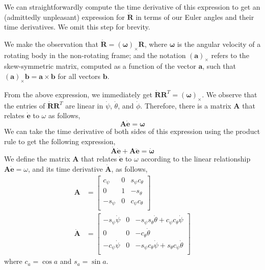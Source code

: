 We can straightforwardly compute the time derivative of this expression to get an (admittedly unpleasant) expression for $\dot{\mathbf{R}}$ in terms of our Euler angles and their time derivatives.
We omit this step for brevity.

We make the observation that $\dot{\mathbf{R}} = (\mathbf{\omega})_{\times} \mathbf{R}$, where $\mathbf{\omega}$ is the angular velocity of a rotating body in the non-rotating frame; and the notation $\left( \mathbf{a} \right)_{\times}$ refers to the skew-symmetric matrix, computed as a function of the vector $\mathbf{a}$, such that $\left(\mathbf{a}\right)_{\times}\mathbf{b} = \mathbf{a}\times\mathbf{b}$ for all vectors $\mathbf{b}$. 

From the above expression, we immediately get $\dot{\mathbf{R}} \mathbf{R}^{T} = (\mathbf{\omega})_{\times}$.
We observe that the entries of $\dot{\mathbf{R}} \mathbf{R}^{T}$ are linear in  $\dot\psi$, $\dot\theta$, and $\dot\phi$.
Therefore, there is a matrix $\mathbf{A}$ that relates $\dot{\mathbf{e}}$ to $\omega$ as follows,
%
\begin{equation}
\mathbf{A} \dot{\mathbf{e}} = \mathbf{\omega}
\label{eqn:ch2:w}
\end{equation}
%
We can take the time derivative of both sides of this expression using the product rule to get the following expression,
%
\begin{equation}
\dot{\mathbf{A}} \dot{\mathbf{e}} + \mathbf{A} \ddot{\mathbf{e}} = \dot{\mathbf{\omega}}
\label{eqn:ch2:w_dot}
\end{equation}
%
We define the matrix $\mathbf{A}$ that relates $\dot{\mathbf{e}}$ to $\omega$ according to the linear relationship $\mathbf{A} \dot{\mathbf{e}} = \omega$, and its time derivative $\dot{\mathbf{A}}$, as follows,
%
\begin{equation}
\begin{aligned}
%
\mathbf{A} & =
\begin{bmatrix}
c_\psi  & 0 & s_\psi c_\theta \\
0       & 1 & -s_\theta       \\
-s_\psi & 0 & c_\psi c_\theta \\
\end{bmatrix} \\
%
\dot{\mathbf{A}} & =
\begin{bmatrix}
-s_\psi \dot{\psi} & 0 & -s_\psi s_\theta \dot{\theta} + c_\psi c_\theta \dot{\psi} \\
0                  & 0 & -c_\theta \dot{\theta} \\
-c_\psi \dot{\psi} & 0 & -s_\psi c_\theta \dot{\psi} + s_\theta c_\psi \dot{\theta} \\
\end{bmatrix}
%
\end{aligned}
\end{equation}
%
where $c_a=\cos a$ and $s_a=\sin a$.

